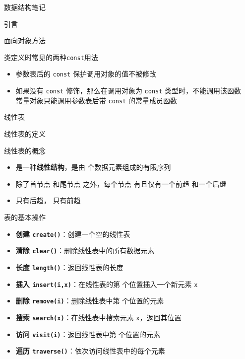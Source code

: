 \documentclass[
  ignorenonframetext,
]{beamer}
\providecommand{\tightlist}{%
  \setlength{\itemsep}{0pt}\setlength{\parskip}{0pt}}
\begin{document}
\begin{frame}[fragile]{数据结构笔记}
\begin{block}{引言}
\begin{block}{面向对象方法}
\begin{block}{类定义时常见的两种\texttt{const}用法}
\begin{enumerate}
  \begin{itemize}
  \tightlist
  \item
    参数表后的 \texttt{const} 保护调用对象的值不被修改
  \item
    如果没有 \texttt{const} 修饰，那么在调用对象为 \texttt{const}
    类型时，不能调用该函数\\
    常量对象只能调用参数表后带 \texttt{const} 的常量成员函数
  \end{itemize}
\end{enumerate}
\end{block}
\end{block}
\end{block}

\begin{block}{线性表}
\protect{}\label{ux7ebfux6027ux8868}
\begin{block}{线性表的定义}
\protect{}\label{ux7ebfux6027ux8868ux7684ux5b9aux4e49}
\begin{block}{线性表的概念}
\protect{}\label{ux7ebfux6027ux8868ux7684ux6982ux5ff5}
\begin{itemize}
\item
  是一种\textbf{线性结构}，是由 {} 个数据元素组成的有限序列
\item
  除了首节点 {} 和尾节点 {} 之外，每个节点 {} 有且仅有一个前趋 {}
  和一个后继 {}
\item
  {} 只有后趋，{} 只有前趋

\end{itemize}
\end{block}

\begin{block}{表的基本操作}
\protect{}\label{ux8868ux7684ux57faux672cux64cdux4f5c}
\begin{itemize}
\tightlist
\item
  \textbf{创建 \texttt{create()}}：创建一个空的线性表
\item
  \textbf{清除 \texttt{clear()}}：删除线性表中的所有数据元素
\item
  \textbf{长度 \texttt{length()}}：返回线性表的长度
\item
  \textbf{插入 \texttt{insert(i,x)}}：在线性表的第 {}
  个位置插入一个新元素 \texttt{x}
\item
  \textbf{删除 \texttt{remove(i)}}：删除线性表中第 {} 个位置的元素
\item
  \textbf{搜索 \texttt{search(x)}}：在线性表中搜索元素
  \texttt{x}，返回其位置
\item
  \textbf{访问 \texttt{visit(i)}}：返回线性表中第 {} 个位置的元素
\item
  \textbf{遍历 \texttt{traverse()}}：依次访问线性表中的每个元素
\end{itemize}
\end{block}


\end{block}
\end{block}
\end{frame}
\end{document}

